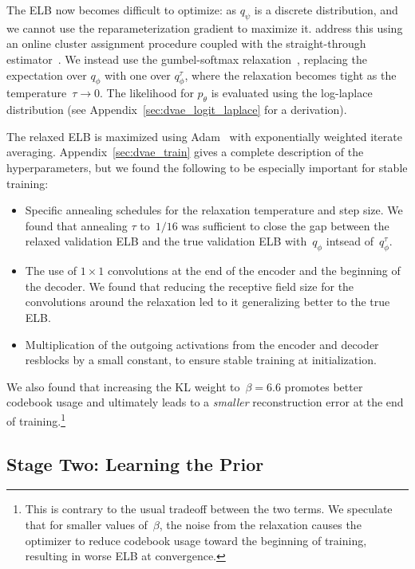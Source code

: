 The ELB now becomes difficult to optimize: as $q_\psi$ is a discrete distribution, and we cannot use the reparameterization gradient to maximize it. \citet{oord2017neural,razavi2019generating} address this using an online cluster assignment procedure coupled with the straight-through estimator~\cite{bengio2013estimating}. We instead use the gumbel-softmax relaxation~\cite{jang2016categorical,maddison2016concrete}, replacing the expectation over $q_\phi$ with one over $q^\tau_\phi$, where the relaxation becomes tight as the temperature~$\tau \to 0$. The likelihood for $p_\theta$ is evaluated using the log-laplace distribution (see Appendix~\ref{sec:dvae_logit_laplace} for a derivation).

The relaxed ELB is maximized using Adam~\cite{kingma2014adam} with exponentially weighted iterate averaging. Appendix~\ref{sec:dvae_train} gives a complete description of the hyperparameters, but we found the following to be especially important for stable training:

\begin{itemize}
    \item Specific annealing schedules for the relaxation temperature and step size. We found that annealing $\tau$ to~$1 / 16$ was sufficient to close the gap between the relaxed validation ELB and the true validation ELB with~$q_\phi$ intsead of~$q_\phi^\tau$.
    \item The use of $1 \times 1$ convolutions at the end of the encoder and the beginning of the decoder. We found that reducing the receptive field size for the convolutions around the relaxation led to it generalizing better to the true ELB.
    \item Multiplication of the outgoing activations from the encoder and decoder resblocks by a small constant, to ensure stable training at initialization.
\end{itemize}

We also found that increasing the KL weight to~$\beta = 6.6$ promotes better codebook usage and ultimately leads to a \emph{smaller} reconstruction error at the end of training.\footnote{This is contrary to the usual tradeoff between the two terms. We speculate that for smaller values of~$\beta$, the noise from the relaxation causes the optimizer to reduce codebook usage toward the beginning of training, resulting in worse ELB at convergence.}

\subsection{Stage Two: Learning the Prior}
\label{sec:learning_prior}


